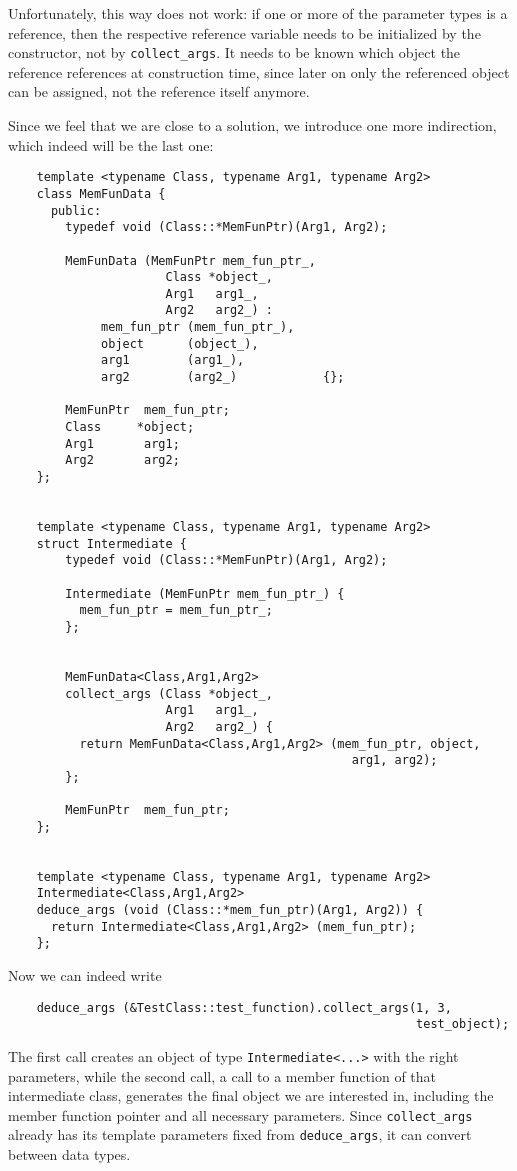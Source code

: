\documentclass[11pt]{article}
\begin{document}
Unfortunately, this way does not work: if one or more of the parameter types
is a reference, then the respective reference variable needs to be initialized
by the constructor, not by \texttt{collect\_args}. It needs to be known which
object the reference references at construction time, since later on only the
referenced object can be assigned, not the reference itself anymore.

Since we feel that we are close to a solution, we introduce one more
indirection, which indeed will be the last one:
\begin{verbatim}
    template <typename Class, typename Arg1, typename Arg2>
    class MemFunData { 
      public:
        typedef void (Class::*MemFunPtr)(Arg1, Arg2);

        MemFunData (MemFunPtr mem_fun_ptr_,
                      Class *object_,
                      Arg1   arg1_,
                      Arg2   arg2_) :
             mem_fun_ptr (mem_fun_ptr_),
             object      (object_),
             arg1        (arg1_),
             arg2        (arg2_)            {};

        MemFunPtr  mem_fun_ptr;
        Class     *object;
        Arg1       arg1;
        Arg2       arg2;
    };


    template <typename Class, typename Arg1, typename Arg2>
    struct Intermediate { 
        typedef void (Class::*MemFunPtr)(Arg1, Arg2);

        Intermediate (MemFunPtr mem_fun_ptr_) {
          mem_fun_ptr = mem_fun_ptr_;
        };

        
        MemFunData<Class,Arg1,Arg2>
        collect_args (Class *object_,
                      Arg1   arg1_,
                      Arg2   arg2_) {
          return MemFunData<Class,Arg1,Arg2> (mem_fun_ptr, object,
                                                arg1, arg2);
        };

        MemFunPtr  mem_fun_ptr;
    };


    template <typename Class, typename Arg1, typename Arg2>
    Intermediate<Class,Arg1,Arg2>
    deduce_args (void (Class::*mem_fun_ptr)(Arg1, Arg2)) {
      return Intermediate<Class,Arg1,Arg2> (mem_fun_ptr);
    };
\end{verbatim}

Now we can indeed write
\begin{verbatim}
    deduce_args (&TestClass::test_function).collect_args(1, 3,
                                                         test_object);
\end{verbatim}
The first call creates an object of type \texttt{Intermediate<...>} with the
right parameters, while the second call, a call to a member function of that
intermediate class, generates the final object we are interested in, including
the member function pointer and all necessary parameters. Since
\texttt{collect\_args} already has its template parameters fixed from
\texttt{deduce\_args}, it can convert between data types.
\end{document}
